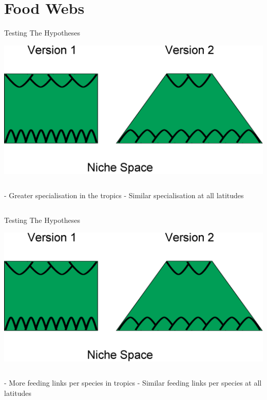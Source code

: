\documentclass{beamer}
\begin{document}
\section*{Food Webs}
  \begin{frame}{Testing The Hypotheses}

    \begin{center}
      \includegraphics[width=.8\textwidth]{Figures/hypothesis_comparison.eps}

    \end{center}

    \begin{columns}
    \column{.5in}
    \column{1.75in}
      - Greater specialisation in the tropics
    \column{.5in}
    \column{1.75in}
      - Similar specialisation at all latitudes
    \column{.5in}
    \end{columns}

  \end{frame}


  \begin{frame}{Testing The Hypotheses}

    \begin{center}
      \includegraphics[width=.8\textwidth]{Figures/hypothesis_comparison.eps}

    \end{center}

    \begin{columns}
    \column{.5in}
    \column{1.75in}
      - More feeding links per species in tropics
    \column{.5in}
    \column{1.75in}
      - Similar feeding links per species at all latitudes
    \column{.5in}
    \end{columns}

  \end{frame}
\end{document}
